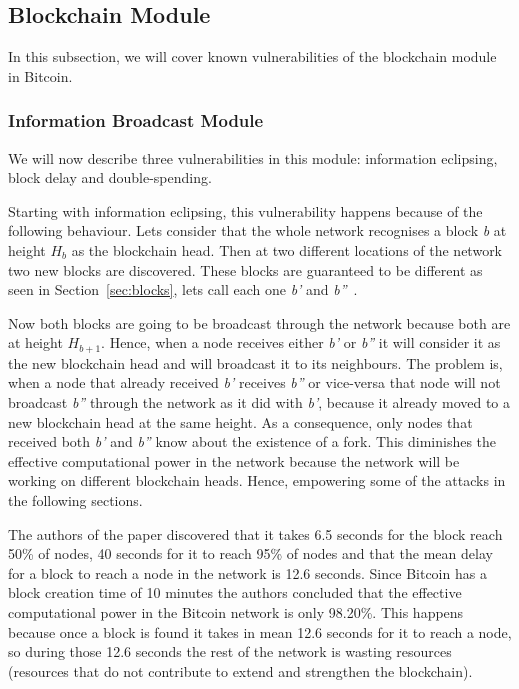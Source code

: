 \subsection{Blockchain Module}
\label{sec:b_module}

In this subsection, we will cover known vulnerabilities of the blockchain module in Bitcoin.

\subsubsection{Information Broadcast Module}
\label{sec:info_broad_module}

We will now describe three vulnerabilities in this module: information eclipsing, block delay and double-spending.

Starting with information eclipsing, this vulnerability happens because of the following behaviour. Lets consider that the whole network recognises a block \textsl{b} at height $H_b$ as the blockchain head. Then at two different locations of the network two new blocks are discovered. These blocks are guaranteed to be different as seen in Section~\ref{sec:blocks}, lets call each one \textit{b'} and \textit{b''}~\cite{decker2013information}.

Now both blocks are going to be broadcast through the network because both are at height $H_{b+1}$. Hence, when a node receives either \textit{b'} or \textit{b''} it will consider it as the new blockchain head and will broadcast it to its neighbours. The problem is, when a node that already received \textit{b'} receives \textit{b''} or vice-versa that node will not broadcast \textit{b''} through the network as it did with \textit{b'}, because it already moved to a new blockchain head at the same height. As a consequence, only nodes that received both \textit{b'} and \textit{b''} know about the existence of a fork. This diminishes the effective computational power in the network because the network will be working on different blockchain heads. Hence, empowering some of the attacks in the following sections.

The authors of the paper discovered that it takes 6.5 seconds for the block reach 50\% of nodes, 40 seconds for it to reach 95\% of nodes and that the mean delay for a block to reach a node in the network is 12.6 seconds. Since Bitcoin has a block creation time of 10 minutes the authors concluded that the effective computational power in the Bitcoin network is only 98.20\%. This happens because once a block is found it takes in mean 12.6 seconds for it to reach a node, so during those 12.6 seconds the rest of the network is wasting resources (resources that do not contribute to extend and strengthen the blockchain).

